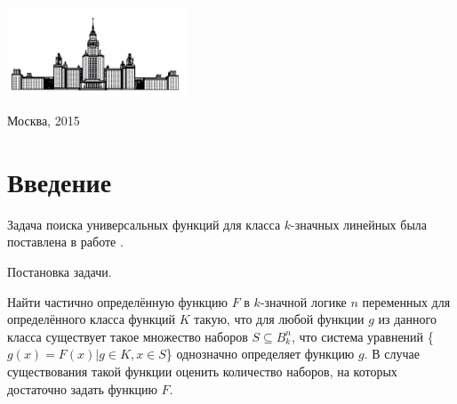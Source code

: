 \documentclass[oneside,final,14pt]{extreport}
\begin{document}
\begin{minipage}{0.45\textwidth}
\hfill             \\
{\bf \underline{ }\underline{ }\underline{ }\underline{ }\underline{ }\underline{ }\underline{ }\underline{ }\underline{ }\underline{ }\underline{ }\underline{ }\underline{ }\underline{ }\underline{ }\underline{ }\underline{ }\underline{ }\underline{ }\underline{ }\underline{ }\underline{ }}
\end{minipage}


\vfill

\centerline {\includegraphics[width=0.4\textwidth]{for_kurs}}

\vfill

\begin{center}
  Москва, 2015
\end{center}

\thispagestyle{empty}

\clearpage

\tableofcontents


 \chapter*{Введение}

Задача поиска универсальных функций для класса \(k\)-значных линейных была поставлена в работе \cite{k_lin}.

Постановка задачи.

Найти частично определённую функцию \(F\) в \(k\)-значной логике \(n\) переменных 
для определённого класса функций \(K\) такую, что для любой функции \(g\) из данного класса существует такое
множество наборов \(S \subseteq B_k ^n\), что система уравнений \{\(g(x) = F(x) | g \in K, x \in S\)\} однозначно определяет
функцию \(g\). В случае существования такой функции оценить количество наборов, 
на которых достаточно задать функцию \(F\).
\end{document}
